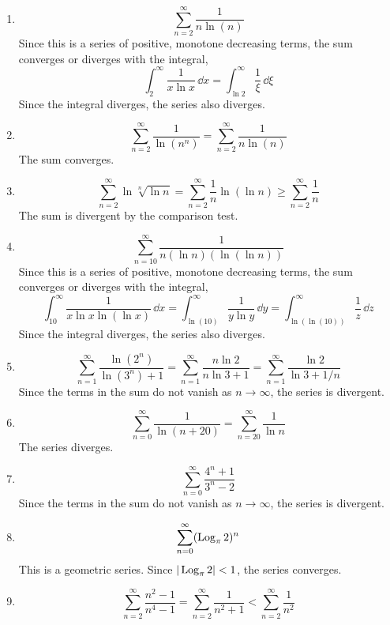 {\begin{Solution}
  \label{solution convergence 1/ ln(nn)}
  \begin{enumerate}
  \item
    \[
    \sum_{n=2}^\infty \frac{1}{n \ln(n)}
    \]
    Since this is a series of positive, monotone decreasing 
    terms, the sum converges or diverges with the integral,
    \[
    \int_2^\infty \frac{1}{x \ln x} \,\dd x = \int_{\ln 2}^\infty \frac{1}{\xi}\,\dd \xi
    \]
    Since the integral diverges, the series also diverges.
  \item
    \[
    \sum_{n=2}^\infty \frac{1}{\ln \left( n^n \right)} = \sum_{n=2}^\infty \frac{1}{n \ln(n)}
    \]
    The sum converges.
  \item
    \[ 
    \sum_{n=2}^\infty \ln \sqrt[n]{\ln n} = 
    \sum_{n=2}^\infty \frac{1}{n} \ln(\ln n) \geq 
    \sum_{n=2}^\infty \frac{1}{n}
    \]
    The sum is divergent by the comparison test.
  \item
    \[
    \sum_{n=10}^\infty \frac{1}{ n (\ln n) (\ln(\ln n)) }
    \]
    Since this is a series of positive, monotone decreasing 
    terms, the sum converges or diverges with the integral,
    \[
    \int_{10}^\infty \frac{1}{x \ln x \ln(\ln x)} \,\dd x 
    = \int_{\ln(10)}^\infty \frac{1}{y \ln y} \,\dd y 
    = \int_{\ln(\ln(10))}^\infty \frac{1}{z} \,\dd z 
    \]
    Since the integral diverges, the series also diverges.
  \item
    \[
    \sum_{n=1}^\infty \frac{ \ln \left( 2^n \right) }{ \ln \left( 3^n \right) + 1 }
    = \sum_{n=1}^\infty \frac{ n \ln 2 }{ n \ln 3 + 1 }
    = \sum_{n=1}^\infty \frac{ \ln 2 }{ \ln 3 + 1/n }
    \]
    Since the terms in the sum do not vanish as $n \to \infty$, the series is 
    divergent.
  \item
    \[
    \sum_{n=0}^\infty \frac{1}{\ln(n + 20)}
    = \sum_{n=20}^\infty \frac{1}{\ln n}
    \]
    The series diverges.
  \item
    \[
    \sum_{n=0}^\infty \frac{4^n + 1}{3^n - 2}
    \]
    Since the terms in the sum do not vanish as $n \to \infty$, the series is 
    divergent.
  \item
    \[
    \sum_{n=0}^\infty (\mathop{\mathrm{Log}}\nolimits_\pi 2)^n
    \]
    This is a geometric series.  Since $| \mathop{\mathrm{Log}}\nolimits_\pi 2 | < 1$, the series 
    converges.
  \item
    \[
    \sum_{n=2}^\infty \frac{n^2 - 1}{n^4 - 1}
    = \sum_{n=2}^\infty \frac{1}{n^2 + 1}
    < \sum_{n=2}^\infty \frac{1}{n^2}
\]
\end{enumerate}
\end{Solution}}
